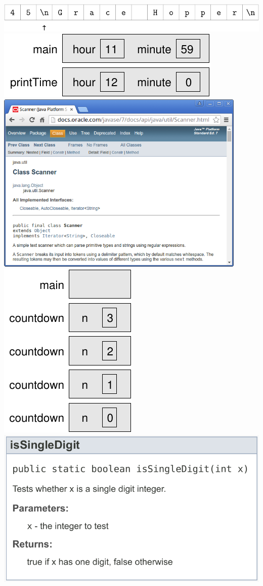 \documentclass[12pt]{book}
\begin{document}
\clearpage%
\includegraphics{./figs/hopper2.pdf}
\clearpage%
\includegraphics[scale=0.9]{./figs/stack.pdf}
\clearpage%
\includegraphics[width=0.9\textwidth]{./figs/scanner.png}
\clearpage%
\includegraphics{./figs/stack2.pdf}
\clearpage%
\includegraphics[scale=0.8]{./figs/javadoc.pdf}
\end{document}
